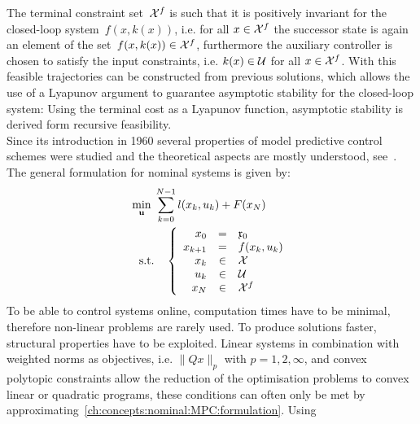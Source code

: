 %
The terminal constraint set~$\mathcal X^f$ is such that it is positively invariant for the closed-loop system~$f(x,k(x))$, i.e. for all $x\in\mathcal X^f$ the successor state is again an element of the set~$f(x,k(x))\in\mathcal X^f$, furthermore the auxiliary controller is chosen to satisfy the input constraints, i.e. $k(x)\in\mathcal U$ for all $x\in \mathcal X^f$. 
%
With this feasible trajectories can be constructed from previous solutions, which allows the use of a Lyapunov argument to guarantee asymptotic stability for the closed-loop system:
%
Using the terminal cost as a Lyapunov function, asymptotic stability is derived form recursive feasibility.
%
\\[1em]
%
Since its introduction in 1960 several properties of model predictive control schemes were studied and the theoretical aspects are mostly understood, see~\cite{Mayne:2000,Scokaert:1999,Mayne:2014}.
%
The general formulation for nominal systems is given by:
%
\begin{equation}\label{ch:concepts:nominal:MPC:formulation}
	\begin{split}
	\min_{\mathbf{u}}\; &\sum_{k=0}^{N-1} l(x_k,u_k)+F(x_N)\\
	\text{s.t.}&\quad\left\{
		\begin{array}{rcl}
		x_0 & = & \mathfrak{x}_0\\
		x_{k+1} & = & f(x_k,u_k)\\
		x_k & \in & \mathcal X\\
		u_k & \in & \mathcal U\\
		x_N & \in & \mathcal X^f
		\end{array}\right.
	\end{split}
\end{equation}
%
To be able to control systems online, computation times have to be minimal, therefore non-linear problems are rarely used. 
%
To produce solutions faster, structural properties have to be exploited. 
%
Linear systems in combination with weighted norms as objectives, i.e. $\|Qx\|_p$ with $p=1,2,\infty$, and convex polytopic constraints allow the reduction of the optimisation problems to convex linear or quadratic programs, these conditions can often only be met by approximating~\eqref{ch:concepts:nominal:MPC:formulation}.
%
Using
%
